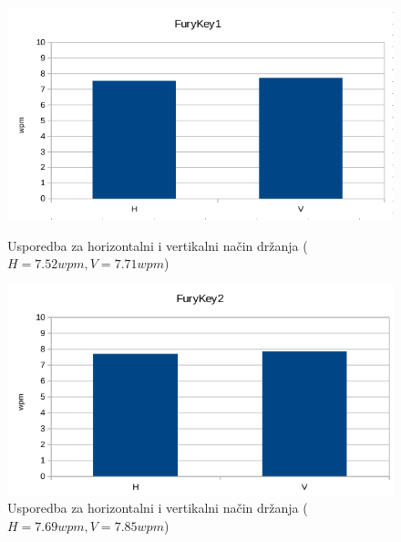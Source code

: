 \documentclass[times, utf8, zavrsni]{fer}
\begin{document}
\begin{figure}[htb]
  \centering
  \begin{minipage}[b]{0.48\textwidth}
    \includegraphics[width=\textwidth]{img/furykey1_HV.png}
    \caption{Usporedba za horizontalni i vertikalni način držanja ($H=7.52wpm, V=7.71wpm$)}
    \label{chart:furykey1_HV}
  \end{minipage}
  \hfill
  \begin{minipage}[b]{0.48\textwidth}
    \includegraphics[width=\textwidth]{img/furykey2_HV.png}
    \caption{Usporedba za horizontalni i vertikalni način držanja ($H=7.69wpm, V=7.85wpm$)}
    \label{chart:furykey2_HV}
  \end{minipage}
\end{figure}
\end{document}
